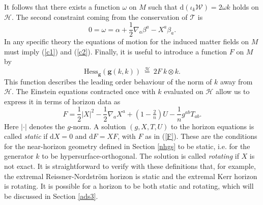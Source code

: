 \documentclass[11pt, reqno]{amsart}
\theoremstyle{plain}
\theoremstyle{definition}
\numberwithin{equation}{section}
\begin{document}
It follows that there exists a function $\omega$ on $M$ such that $\text{d}(\iota_k\mathcal{W}) = 2\omega k$ holds on $\mathcal{H}$.
The second constraint coming from the conservation of $\mathcal{T}$ is
\begin{equation} \label{c2}
    0 = \omega = \alpha + \frac 12\nabla_a\beta^a - X^a\beta_a.
\end{equation}
In any specific theory the equations of motion for the induced matter fields on $M$ must imply (\ref{c1}) and (\ref{c2}). Finally, it is useful to introduce a function $F$ on $M$ by
\begin{equation}
    \text{Hess}_{\textbf{g}}(\textbf{g}(k,k)) \:\overset{\mathcal{H}}{=}\: 2F\:k\otimes k.
\end{equation}
This function describes the leading order behaviour of the norm of $k$ away from $\mathcal{H}$. The Einstein equations contracted once with $k$ evaluated on $\mathcal{H}$ allow us to express it in terms of horizon data as
\begin{equation}
    F = \frac 12\vert X \vert^2 - \frac 12 \nabla_a X^a + (1-\tfrac 2n)U - \frac 1n g^{ab}T_{ab}. \label{F}
\end{equation}
Here $\vert \cdot \vert$ denotes the $g$-norm. A solution $(g,X,T,U)$ to the horizon equations is called \textit{static} if d$X = 0$ and $\text{d}F = XF$, with $F$ as in (\ref{F}). These are the conditions for the near-horizon geometry defined in Section \ref{nhgs} to be static, i.e. for the generator $k$ to be hypersurface-orthogonal. The solution is called \textit{rotating} if $X$ is not exact. It is straightforward to verify with these definitions that, for example, the extremal Reissner-Nordstr\"om horizon is static and the extremal Kerr horizon is rotating. It is possible for a horizon to be both static and rotating, which will be discussed in Section \ref{ads3}.
\end{document}
